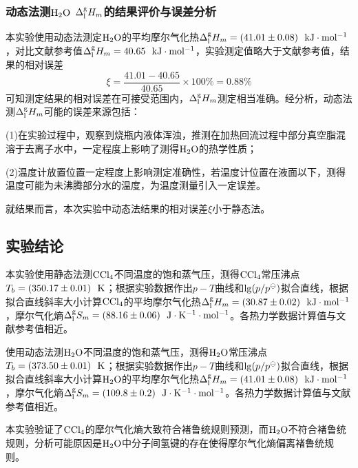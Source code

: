 \documentclass[12pt]{article}
\begin{document}
\subsubsection{动态法测$\rm H_{2}O$ $\Delta^{\rm g}_{\rm l}H_{m}$的结果评价与误差分析} 
本实验使用动态法测定$\rm H_{2}O$的平均摩尔气化热$\Delta^{\rm g}_{\rm l}H_{m}=(41.01\pm 0.08)\ \ {\rm kJ\cdot mol^{-1}}$，对比文献参考值\citealp{crc}$\Delta^{\rm g}_{\rm l}H_{m}=40.65\ \ {\rm kJ\cdot mol^{-1}}$，实验测定值略大于文献参考值，结果的相对误差
$$
\xi=\frac{41.01-40.65}{40.65}\times 100\%=0.88\%
$$
可知测定结果的相对误差在可接受范围内，$\Delta^{\rm g}_{\rm l}H_{m}$测定相当准确。经分析，动态法测$\Delta^{\rm g}_{\rm l}H_{m}$可能的误差来源包括：
\par 
(1)在实验过程中，观察到烧瓶内液体浑浊，推测在加热回流过程中部分真空脂混溶于去离子水中，一定程度上影响了测得$\rm H_{2}O$的热学性质；\par 
(2)温度计放置位置一定程度上影响测定准确性，若温度计位置在液面以下，测得温度可能为未沸腾部分水的温度，为温度测量引入一定误差。\par
就结果而言，本次实验中动态法结果的相对误差$\xi$小于静态法。



 	 \subsection{实验结论}
本实验使用静态法测$\rm CCl_{4}$不同温度的饱和蒸气压，测得$\rm CCl_{4}$常压沸点$T_{b}=(350.17\pm 0.01)\ \ {\rm K}$；根据实验数据作出$p-T$曲线和${\rm lg}(p/p^{\ominus})$拟合直线，根据拟合直线斜率大小计算$\rm CCl_{4}$的平均摩尔气化热$\Delta^{\rm g}_{\rm l}H_{m}=(30.87\pm 0.02)\ \ {\rm kJ\cdot mol^{-1}}$，摩尔气化熵$\Delta^{\rm g}_{\rm l}S_{m}=(88.16\pm 0.06)\ \ {\rm J\cdot K^{-1}\cdot mol^{-1}}$。各热力学数据计算值与文献参考值相近。\par 
使用动态法测$\rm H_{2}O$不同温度的饱和蒸气压，测得$\rm H_{2}O$常压沸点$T_{b}=(373.50\pm 0.01)\ \ {\rm K}$；根据实验数据作出$p-T$曲线和${\rm lg}(p/p^{\ominus})$拟合直线，根据拟合直线斜率大小计算$\rm H_{2}O$的平均摩尔气化热$\Delta^{\rm g}_{\rm l}H_{m}=(41.01\pm 0.08)\ \ {\rm kJ\cdot mol^{-1}}$，摩尔气化熵$\Delta^{\rm g}_{\rm l}S_{m}=(109.8\pm 0.2)\ \ {\rm J\cdot K^{-1}\cdot mol^{-1}}$。各热力学数据计算值与文献参考值相近。\par 
本实验验证了$\rm CCl_{4}$的摩尔气化熵大致符合褚鲁统规则预测，而$\rm H_{2}O$不符合褚鲁统规则，分析可能原因是$\rm H_{2}O$中分子间氢键的存在使得摩尔气化熵偏离褚鲁统规则。


 

   

\vbox{}



\end{document}
